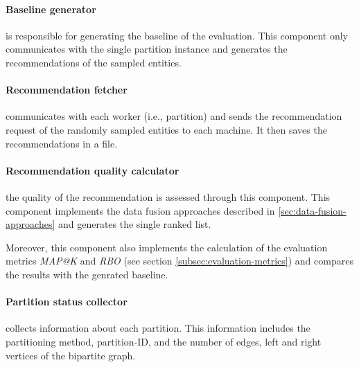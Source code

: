 \paragraph{Baseline generator}
is responsible for generating the baseline of the evaluation. This component only communicates with the single partition instance and generates the recommendations of the sampled entities.

\paragraph{Recommendation fetcher}
communicates with each worker (i.e., partition) and sends the recommendation request of the randomly sampled entities to each machine. It then saves the recommendations in a file.

\paragraph{Recommendation quality calculator}
the quality of the recommendation is assessed through this component. This component implements the data fusion approaches described in \ref{sec:data-fusion-approaches} and generates the single ranked list.

Moreover, this component also implements the calculation of the evaluation metrics \emph{MAP@K} and \emph{RBO} (see section \ref{subsec:evaluation-metrics}) and compares the results with the genrated baseline.

\paragraph{Partition status collector}
collects information about each partition. This information includes the partitioning method, partition-ID, and the number of edges, left and right vertices of the bipartite graph.

